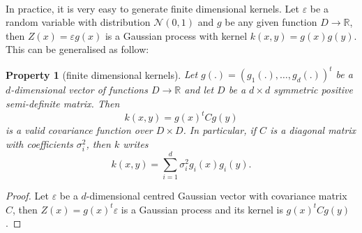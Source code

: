 \documentclass[twoside,openright]{report}
\newtheorem{property}{Property}
\begin{document}
\paragraph{}
In practice, it is very easy to generate finite dimensional kernels. Let $\varepsilon$ be a random variable with distribution $\mathcal{N}(0,1)$ and $g$ be any given function $D \rightarrow \mathds{R}$, then $Z(x)=\varepsilon g(x)$ is a Gaussian process with kernel $k(x,y)=g(x)g(y)$. This can be generalised as follow:
\begin{property}[finite dimensional kernels]
    Let $g(.) = (g_1(.),\dots,g_d(.))^t$ be a $d$-dimensional vector of functions $D \rightarrow \mathds{R}$ and let $D$ be a $d \times d$ symmetric positive semi-definite matrix. Then
    \begin{equation}
        k(x,y) = g(x)^t C g(y)
    \end{equation}
    is a valid covariance function over $D \times D$. In particular, if $C$ is a diagonal matrix with coefficients $\sigma_i^2$, then $k$ writes
        \begin{equation}
        k(x,y) = \sum_{i=1}^d \sigma_i^2 g_i(x)g_i(y).
    \end{equation}
\end{property}
\begin{proof}
    Let $\varepsilon$ be a $d$-dimensional centred Gaussian vector with covariance matrix $C$, then $Z(x)= g(x)^t \varepsilon$ is a Gaussian process and its kernel is $g(x)^t C g(y)$.
\end{proof}
\end{document}
